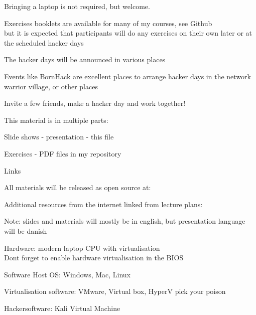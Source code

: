 \documentclass[Screen16to9,17pt]{foils}
\begin{document}

\begin{list2}
\item Bringing a laptop is not required, but welcome.
\item Exercises booklets are available for many of my courses, see Github\\
but it is expected that participants will do any exercises on their own later or at the scheduled hacker days
\item The hacker days will be announced in various places

\item Events like BornHack are excellent places to arrange hacker days in the network warrior village, or other places
\end{list2}

\vskip 1cm

\centerline{\LARGE Invite a few friends, make a hacker day and work together!}


\begin{list1}
\item This material is in multiple parts:
\begin{list2}
\item Slide shows - presentation - this file
\item Exercises - PDF files in my repository
\end{list2}
\item Links
\begin{list2}
\item All materials will be released as open source at:\\
\item Additional resources from the internet linked from lecture plans:\\
\end{list2}
\end{list1}

Note: slides and materials will mostly be in english, but presentation language will be danish




\begin{list2}
\item Hardware: modern laptop CPU with virtualisation\\
Dont forget to enable hardware virtualisation in the BIOS
\item Software Host OS: Windows, Mac, Linux
\item Virtualisation software: VMware, Virtual box, HyperV pick your poison
\item Hackersoftware: Kali Virtual Machine 
\end{list2}
\end{document}
